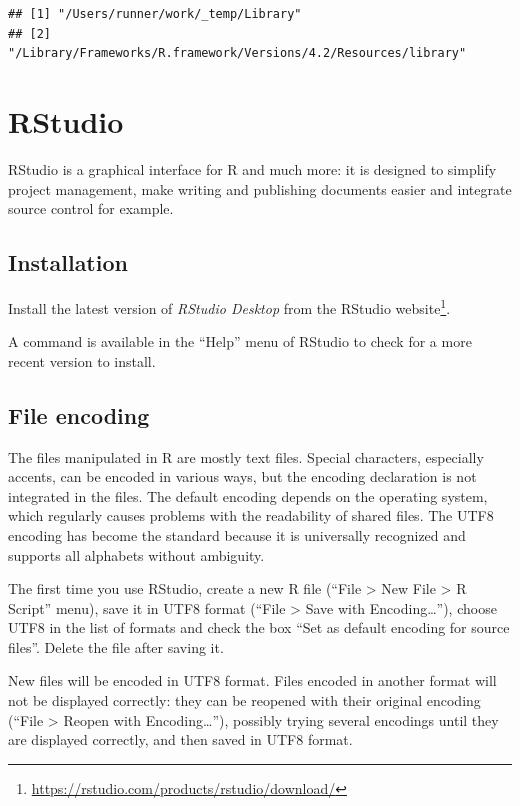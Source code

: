 \documentclass[
  12pt,
  american,
  a4paper,
  extrafontsizes,onecolumn,openright
  ]{memoir}
\newlength{\rf}
\begin{document}
\begin{verbatim}
## [1] "/Users/runner/work/_temp/Library"                              
## [2] "/Library/Frameworks/R.framework/Versions/4.2/Resources/library"
\end{verbatim}

\normalsize

\hypertarget{rstudio}{%
\section{RStudio}\label{rstudio}}

RStudio is a graphical interface for R and much more: it is designed to simplify project management, make writing and publishing documents easier and integrate source control for example.

\hypertarget{installation-1}{%
\subsection{Installation}\label{installation-1}}

Install the latest version of \emph{RStudio Desktop} from the RStudio website\footnote{\url{https://rstudio.com/products/rstudio/download/}}.

A command is available in the \enquote{Help} menu of RStudio to check for a more recent version to install.

\hypertarget{file-encoding}{%
\subsection{File encoding}\label{file-encoding}}

The files manipulated in R are mostly text files.
Special characters, especially accents, can be encoded in various ways, but the encoding declaration is not integrated in the files.
The default encoding depends on the operating system, which regularly causes problems with the readability of shared files.
The UTF8 encoding has become the standard because it is universally recognized and supports all alphabets without ambiguity.

The first time you use RStudio, create a new R file (\enquote{File \textgreater{} New File \textgreater{} R Script} menu), save it in UTF8 format (\enquote{File \textgreater{} Save with Encoding\ldots{}}), choose UTF8 in the list of formats and check the box \enquote{Set as default encoding for source files}.
Delete the file after saving it.

New files will be encoded in UTF8 format.
Files encoded in another format will not be displayed correctly: they can be reopened with their original encoding (\enquote{File \textgreater{} Reopen with Encoding\ldots{}}), possibly trying several encodings until they are displayed correctly, and then saved in UTF8 format.
\end{document}
